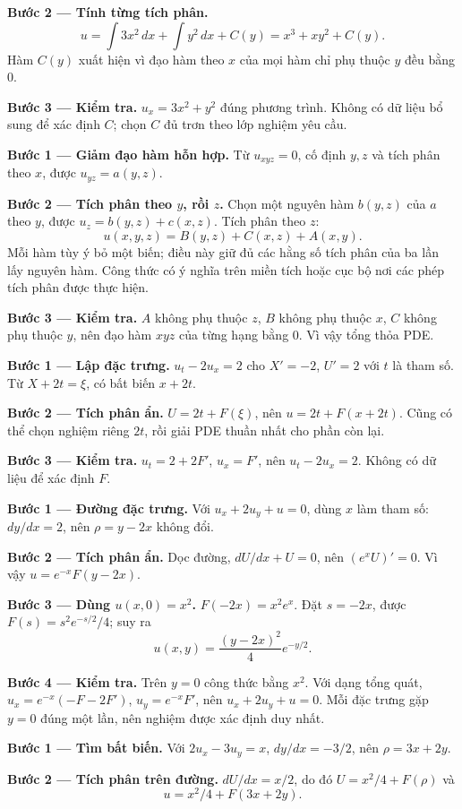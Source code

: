 \textbf{Bước 2 — Tính từng tích phân.}
\[u=\int3x^2\,dx+\int y^2\,dx+C(y)=x^3+xy^2+C(y).\]
Hàm $C(y)$ xuất hiện vì đạo hàm theo $x$ của mọi hàm chỉ phụ thuộc $y$ đều bằng 0.

\textbf{Bước 3 — Kiểm tra.} $u_x=3x^2+y^2$ đúng phương trình. Không có dữ liệu bổ sung để xác định $C$; chọn $C$ đủ trơn theo lớp nghiệm yêu cầu.

\textbf{Bước 1 — Giảm đạo hàm hỗn hợp.} Từ $u_{xyz}=0$, cố định $y,z$ và tích phân theo $x$, được $u_{yz}=a(y,z)$.

\textbf{Bước 2 — Tích phân theo $y$, rồi $z$.} Chọn một nguyên hàm $b(y,z)$ của $a$ theo $y$, được $u_z=b(y,z)+c(x,z)$. Tích phân theo $z$:
\[u(x,y,z)=B(y,z)+C(x,z)+A(x,y).\]
Mỗi hàm tùy ý bỏ một biến; điều này giữ đủ các hằng số tích phân của ba lần lấy nguyên hàm. Công thức có ý nghĩa trên miền tích hoặc cục bộ nơi các phép tích phân được thực hiện.

\textbf{Bước 3 — Kiểm tra.} $A$ không phụ thuộc $z$, $B$ không phụ thuộc $x$, $C$ không phụ thuộc $y$, nên đạo hàm $xyz$ của từng hạng bằng 0. Vì vậy tổng thỏa PDE.

\textbf{Bước 1 — Lập đặc trưng.} $u_t-2u_x=2$ cho $X'=-2$, $U'=2$ với $t$ là tham số. Từ $X+2t=\xi$, có bất biến $x+2t$.

\textbf{Bước 2 — Tích phân ẩn.} $U=2t+F(\xi)$, nên $u=2t+F(x+2t)$. Cũng có thể chọn nghiệm riêng $2t$, rồi giải PDE thuần nhất cho phần còn lại.

\textbf{Bước 3 — Kiểm tra.} $u_t=2+2F'$, $u_x=F'$, nên $u_t-2u_x=2$. Không có dữ liệu để xác định $F$.

\textbf{Bước 1 — Đường đặc trưng.} Với $u_x+2u_y+u=0$, dùng $x$ làm tham số: $dy/dx=2$, nên $\rho=y-2x$ không đổi.

\textbf{Bước 2 — Tích phân ẩn.} Dọc đường, $dU/dx+U=0$, nên $(e^xU)'=0$. Vì vậy $u=e^{-x}F(y-2x)$.

\textbf{Bước 3 — Dùng $u(x,0)=x^2$.} $F(-2x)=x^2e^x$. Đặt $s=-2x$, được $F(s)=s^2e^{-s/2}/4$; suy ra
\[u(x,y)=\frac{(y-2x)^2}{4}e^{-y/2}.\]

\textbf{Bước 4 — Kiểm tra.} Trên $y=0$ công thức bằng $x^2$. Với dạng tổng quát, $u_x=e^{-x}(-F-2F')$, $u_y=e^{-x}F'$, nên $u_x+2u_y+u=0$. Mỗi đặc trưng gặp $y=0$ đúng một lần, nên nghiệm được xác định duy nhất.

\textbf{Bước 1 — Tìm bất biến.} Với $2u_x-3u_y=x$, $dy/dx=-3/2$, nên $\rho=3x+2y$.

\textbf{Bước 2 — Tích phân trên đường.} $dU/dx=x/2$, do đó $U=x^2/4+F(\rho)$ và
\[u=x^2/4+F(3x+2y).\]

